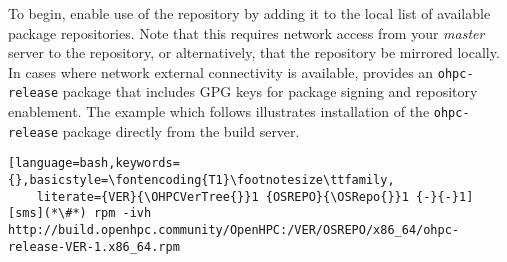 To begin, enable use of the \OHPC{} repository by adding it to the local list
of available package repositories. Note that this requires network access from
your {\em master} server to the \OHPC{} repository, or alternatively, that
the \OHPC{} repository be mirrored locally.  In cases where network external
connectivity is available, \OHPC{} provides an \texttt{ohpc-release} package
that includes GPG keys for package signing and repository enablement.  The
example which follows illustrates installation of the \texttt{ohpc-release}
package directly from the \OHPC{} build server.


\begin{lstlisting}[language=bash,keywords={},basicstyle=\fontencoding{T1}\footnotesize\ttfamily,
	literate={VER}{\OHPCVerTree{}}1 {OSREPO}{\OSRepo{}}1 {-}{-}1]
[sms](*\#*) rpm -ivh http://build.openhpc.community/OpenHPC:/VER/OSREPO/x86_64/ohpc-release-VER-1.x86_64.rpm
\end{lstlisting}







